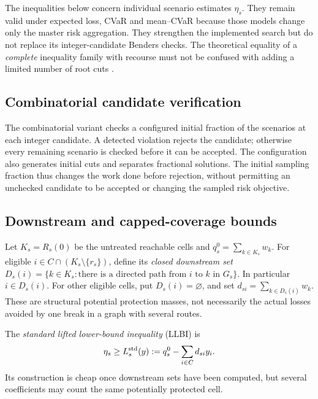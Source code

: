 The inequalities below concern individual scenario estimates $\eta_s$.
They remain valid under expected loss, CVaR and mean--CVaR because those
models change only the master risk aggregation. They strengthen the
implemented search but do not replace its integer-candidate Benders
checks. The theoretical equality of a \emph{complete} inequality family
with recourse must not be confused with adding a limited number of root
cuts \citep{rahmaniani2017benders}.

\subsection{Combinatorial candidate verification}

The combinatorial variant checks a configured initial fraction of the
scenarios at each integer candidate. A detected violation rejects the
candidate; otherwise every remaining scenario is checked before it
can be accepted. The configuration also generates initial cuts and
separates fractional solutions. The initial sampling fraction thus
changes the work done before rejection, without permitting an
unchecked candidate to be accepted or changing the sampled risk
objective.

\subsection{Downstream and capped-coverage bounds}
\label{sec:coverage}

Let $K_s=R_s(0)$ be the untreated reachable cells and
$q_s^0=\sum_{k\in K_s}w_k$. For eligible $i\in C\cap
(K_s\setminus\{r_s\})$, define its \emph{closed downstream set}
$D_s(i)=\{k\in K_s:\text{there is a directed path from $i$ to $k$}
\text{ in }G_s\}$. In particular $i\in D_s(i)$. For other eligible cells,
put $D_s(i)=\varnothing$, and set
$d_{si}=\sum_{k\in D_s(i)}w_k$. These are structural potential
protection masses, not necessarily the actual losses avoided by one break
in a graph with several routes.

The \emph{standard lifted lower-bound inequality} (LLBI) is
\begin{equation}\label{eq:standard}
 \eta_s\ge L_s^{\rm std}(y):=
           q_s^0-\sum_{i\in C}d_{si}y_i.
\end{equation}
Its construction is cheap once downstream sets have been computed, but
several coefficients may count the same potentially protected cell.

